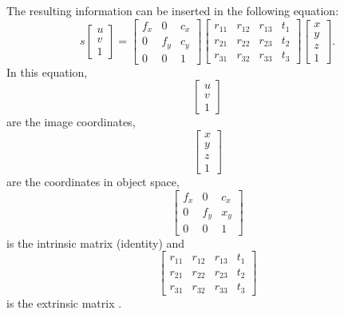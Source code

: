 The resulting information can be inserted in the following equation:
\begin{equation}\label{eq:pipeline}
s \left[ \begin{array}{ccc} 
u\\
v\\
1 \end{array} \right] = 
\left[ \begin{array}{ccc} 
f_{x} & 0 & c_{x}\\
0 & f_{y} & c_{y}\\
0 & 0 & 1 \end{array} \right] 
\left[ \begin{array}{cccc} 
r_{11} & r_{12} & r_{13} & t_{1}\\
r_{21} & r_{22} & r_{23} & t_{2}\\
r_{31} & r_{32} & r_{33} & t_{3} \end{array} \right] 
\left[ \begin{array}{ccc} 
x\\
y\\
z\\
1  \end{array} \right] 
.
\end{equation}
In this equation,
$$
\left[ \begin{array}{ccc} 
u\\
v\\
1 \end{array} \right]
$$
are the image coordinates,
$$
\left[ \begin{array}{ccc} 
x\\
y\\
z\\
1  \end{array} \right] 
$$
are the coordinates in object space,
$$
\left[ \begin{array}{ccc} 
f_{x} & 0 & c_{x}\\
0 & f_{y} & x_{y}\\
0 & 0 & 1 \end{array} \right]
$$
is the intrinsic matrix (identity) and
$$
\left[ \begin{array}{cccc} 
r_{11} & r_{12} & r_{13} & t_{1}\\
r_{21} & r_{22} & r_{23} & t_{2}\\
r_{31} & r_{32} & r_{33} & t_{3}
\end{array} \right]
$$
is the extrinsic matrix \cite{OPENCV}.

